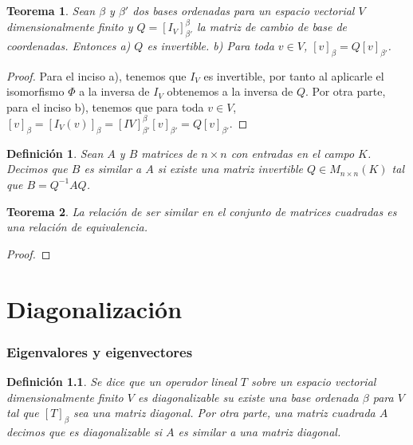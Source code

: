 \documentclass{book}
\newtheorem{theorem}{Teorema}
\newtheorem{definition}{Definición}
\begin{document}

\begin{theorem}
Sean $\beta$ y $\beta '$ dos bases ordenadas para un espacio vectorial $V$ dimensionalmente finito y $Q=[I_V]_{\beta '} ^{\beta}$ la matriz de cambio de base de coordenadas. Entonces \newline
a) $Q$ es invertible. \newline
b) Para toda $v\in V$, $[v]_{\beta}=Q[v]_{\beta'}$.
\end{theorem}

\begin{proof} %
Para el inciso a), tenemos que $I_V$ es invertible, por tanto al aplicarle el isomorfismo $\Phi$ a la inversa de $I_V$ obtenemos a la inversa de $Q$. Por otra parte, para el inciso b), tenemos que para toda $v\in V$, $[v]_{\beta}=[I_{V}(v)]_{\beta}=[I{V}]_{\beta '} ^{\beta} [v]_{\beta'}=Q[v]_{\beta'}$.
\end{proof}

\begin{definition}
Sean $A$ y $B$ matrices de $n \times n$ con entradas en el campo $K$. Decimos que $B$ es similar a $A$ si existe una matriz invertible $Q\in M_{n \times n}(K)$ tal que $B=Q^{-1}AQ$.
\end{definition}

\begin{theorem}
La relación de ser similar en el conjunto de matrices cuadradas es una relación de equivalencia.
\end{theorem}

\begin{proof}

\end{proof}

\chapter{Diagonalización}
\subsection{Eigenvalores y eigenvectores}

\begin{definition}
Se dice que un operador lineal $T$ sobre un espacio vectorial dimensionalmente finito $V$ es diagonalizable su existe una base ordenada $\beta$ para $V$ tal que $[T]_{\beta}$ sea una matriz diagonal. Por otra parte, una matriz cuadrada $A$ decimos que es diagonalizable si $A$ es similar a una matriz diagonal.
\end{definition}
\end{document}
